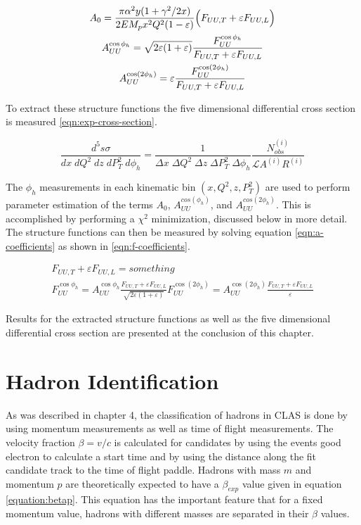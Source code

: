 \begin{gather}
	\label{eqn:a-coefficients}
	A_{0} = \frac{\pi \alpha^2 y (1+\gamma^2/2x)}{2 E M_p x^2 Q^2 (1-\varepsilon)} \Bigl( F_{UU,T} + \varepsilon F_{UU,L} \Bigr) \\
	A_{UU}^{\cos\phi_h} = \sqrt{2\varepsilon(1+\varepsilon)} \frac{F_{UU}^{\cos\phi_h}}{F_{UU,T} + \varepsilon F_{UU,L}} \\
	A_{UU}^{\cos(2\phi_h)} = \varepsilon \frac{F_{UU}^{\cos(2\phi_h)}}{F_{UU,T} + \varepsilon F_{UU,L}}
\end{gather}

To extract these structure functions the five dimensional differential cross section is measured \ref{eqn:exp-cross-section}.

\begin{equation}
	\label{eqn:exp-cross-section}
	\frac{d^5s\sigma}{dx \; dQ^2 \; dz \; dP_T^2 \; d\phi_h} = \frac{1}{\Delta x \; \Delta Q^2 \; \Delta z \; \Delta P_T^2 \; \Delta \phi_h} \frac{N_{obs}^{(i)}}{\mathcal{L} A^{(i)} R^{(i)}} 
\end{equation}

The $\phi_h$ measurements in each kinematic bin $(x, Q^2, z, P_T^2)$ are used to perform parameter estimation of the terms $A_{0}$, $A_{UU}^{cos(\phi_h)}$, and $A_{UU}^{cos(2\phi_h)}$.  This is accomplished by performing a $\chi^2$ minimization, discussed below in more detail.  The structure functions can then be measured by solving equation \ref{eqn:a-coefficients} as shown in \ref{eqn:f-coefficients}.

\begin{gather}
	F_{UU,T} + \varepsilon F_{UU,L} = something \\
	F_{UU}^{\cos\phi_h} = A_{UU}^{\cos\phi_h}  \frac{ F_{UU,T} + \varepsilon F_{UU,L}}{\sqrt{2\varepsilon(1+\varepsilon)}}
	F_{UU}^{\cos(2\phi_h)} = A_{UU}^{\cos(2\phi_h)} \frac{ F_{UU,T} + \varepsilon F_{UU,L}}{\varepsilon}
\end{gather}

Results for the extracted structure functions as well as the five dimensional differential cross section are presented at the conclusion of this chapter.  

\section{Hadron Identification}
%
%

As was described in chapter 4, the classification of hadrons in CLAS is done by using momentum measurements as well as time of flight measurements.  The velocity fraction $\beta = v/c$ is calculated for candidates by using the events good electron to calculate a start time and by using the distance along the fit candidate track to the time of flight paddle.  Hadrons with mass $m$ and momentum $p$ are theoretically expected to have a $\beta_{exp}$ value given in equation \ref{equation:betap}.  This equation has the important feature that for a fixed momentum value, hadrons with different masses are separated in their $\beta$ values.

